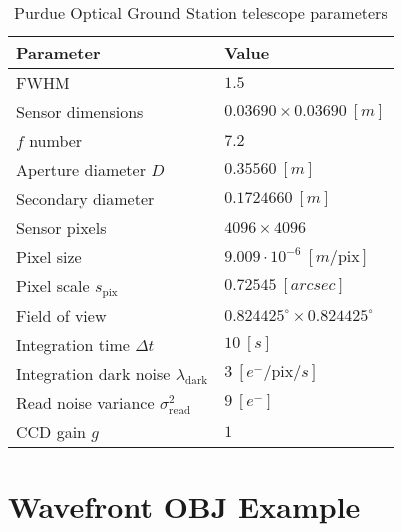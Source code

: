 \begin{table}[ht]
    \centering
    \begin{tabular}{|l|l|}
    \hline
    \textbf{Parameter} & \textbf{Value} \\ \hline
    FWHM                & $1.5$                              \\ \hline
    Sensor dimensions    & $ 0.03690 \times 0.03690 \: [m]$                               \\ \hline
    $f$ number   & $7.2$                              \\ \hline
    Aperture diameter $D$       & $0.35560 \: [m]$                              \\ \hline
    Secondary diameter         & $0.1724660 \: [m]$                              \\ \hline
    Sensor pixels               & $4096 \times 4096$                              \\ \hline
    Pixel size               & $9.009 \cdot 10^{-6} \: [m / \textrm{pix}]$                              \\ \hline
    Pixel scale $s_\mathrm{pix}$              & $0.72545 \: [arcsec]$                              \\ \hline
    Field of view               & $0.824425^\circ \times 0.824425^\circ$                              \\ \hline
    Integration time $\Delta t$              & $10 \: [s]$                              \\ \hline
    Integration dark noise $\lambda_\mathrm{dark}$ & $3 \: \left[ e^- / \mathrm{pix} / s\right]$ \\ \hline
    Read noise variance $\sigma_\mathrm{read}^2$ & $9 \: \left[ e^- \right]$ \\ \hline
    CCD gain $g$ & $1$ \\ \hline
    \end{tabular}
    \caption{Purdue Optical Ground Station telescope parameters}
    \label{tb:pogs_parameters}
  \end{table}

\clearpage
\section{Wavefront OBJ Example} \label{sec:obj_listing}

\begin{listing}[ht]
    \inputminted[breaklines=true, breakanywhere=true, breaksymbol=\hspace{0pt}, fontsize=\scriptsize]{text}{/Users/liamrobinson/Documents/PyLightCurves/mirage/resources/models/cube.obj}
\end{listing}